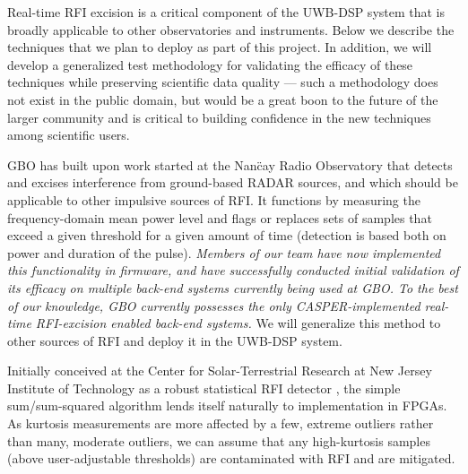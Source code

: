 \documentclass[10pt]{myNSF}
\begin{document}
Real-time RFI excision is a critical component of the UWB-DSP system
that is broadly applicable to other observatories and instruments.
Below we describe the techniques that we plan to deploy as part of
this project.  In addition, we will develop a generalized test
methodology for validating the efficacy of these techniques while
preserving scientific data quality --- such a methodology does not
exist in the public domain, but would be a great boon to the future of
the larger community and is critical to building confidence in the new
techniques among scientific users.

 GBO has built upon
work started at the Nan\"{c}ay Radio Observatory \citep{dwr17} that
detects and excises interference from ground-based RADAR sources, and
which should be applicable to other impulsive sources of RFI.  It
functions by measuring the frequency-domain mean power level and flags
or replaces sets of samples that exceed a given threshold for a given
amount of time (detection is based both on power and duration of the
pulse).  \emph{Members of our team have now implemented this
  functionality in firmware, and have successfully conducted initial
  validation of its efficacy on multiple back-end systems currently
  being used at GBO.  To the best of our knowledge, GBO currently
  possesses the only CASPER-implemented real-time RFI-excision enabled
  back-end systems.}  We will generalize this method to other sources
of RFI and deploy it in the UWB-DSP system.

 Initially conceived at the Center for
Solar-Terrestrial Research at New Jersey Institute of Technology as a
robust statistical RFI detector \citep{ng10,nhmg16}, the simple
sum/sum-squared algorithm lends itself naturally to implementation in
FPGAs.  As kurtosis measurements are more affected by a few, extreme
outliers rather than many, moderate outliers, we can assume that any
high-kurtosis samples (above user-adjustable thresholds) are
contaminated with RFI and are mitigated.
\end{document}
